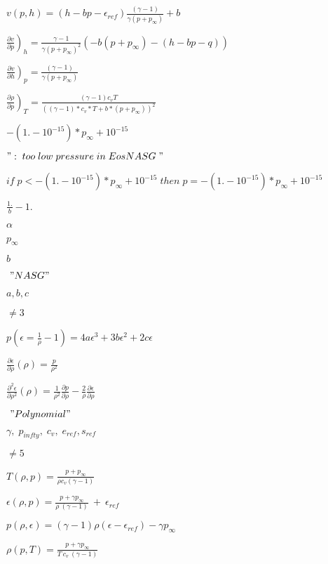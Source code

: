 \documentclass{article}
\begin{document}
$ v(p,h) = (h - bp -\epsilon_{ref})\frac{(\gamma-1)}{\gamma (p+p_{\infty})}+b $
\pagebreak

$ \left. \frac{\partial v}{\partial p} \right)_h = \frac{\gamma-1}{\gamma (p+p_{\infty})^2} \left(-b(p+p_{\infty})-(h-bp-q)\right) $
\pagebreak

$ \left. \frac{\partial v}{\partial h} \right)_p = \frac{(\gamma-1)}{\gamma (p+p_{\infty})} $
\pagebreak

$ \left. \frac{\partial \rho}{\partial p} \right)_T = \frac{(\gamma -1) c_v T}{\left((\gamma - 1)* c_v * T + b * (p + p_{\infty})\right)^2} $
\pagebreak

$ -(1. - 10^{-15})*p_{\infty} + 10^{-15} $
\pagebreak

$ " :\;too\;low\;pressure \;in\; EosNASG\;"$
\pagebreak

$ if \; p < -(1. - 10^{-15})*p_{\infty} + 10^{-15} \; then \; p= -(1. - 10^{-15})*p_{\infty} + 10^{-15} $
\pagebreak

$ \frac{1.}{b} - 1. $
\pagebreak

$ \alpha $
\pagebreak

$ p_{\infty} $
\pagebreak

$ b $
\pagebreak

$ \ "NASG" $
\pagebreak

$ a, b, c$
\pagebreak

$ \neq 3$
\pagebreak

$ p (\epsilon = \frac{1}{\rho} - 1) = 4 a \epsilon^3 + 3 b \epsilon^2 + 2 c \epsilon $
\pagebreak

$ \frac{\partial \epsilon}{\partial \rho} (\rho) = \frac{p}{\rho^2} $
\pagebreak

$ \frac{\partial^2 \epsilon}{\partial \rho^2} (\rho) = \frac{1}{\rho^2} \frac{\partial p}{\partial \rho} - \frac{2}{\rho} \frac{\partial \epsilon}{\partial \rho} $
\pagebreak

$ \ "Polynomial" $
\pagebreak

$ \gamma, \; p_{infty}, \; c_v, \; e_{ref}, s_{ref}$
\pagebreak

$ \neq 5$
\pagebreak

$ T(\rho, p) = \frac{p+p_{\infty}}{\rho c_v (\gamma-1)}$
\pagebreak

$ \epsilon (\rho, p) = \frac{p + \gamma p_{\infty}}{\rho \ (\gamma-1)} \ + \ \epsilon_{ref} $
\pagebreak

$ p(\rho, \epsilon) = (\gamma-1)\rho(\epsilon - \epsilon_{ref}) - \gamma p_{\infty}$
\pagebreak

$ \rho(p, T) = \frac{p + \gamma p_{\infty} }{T \ c_v \ (\gamma-1)}\ $
\pagebreak
\end{document}
